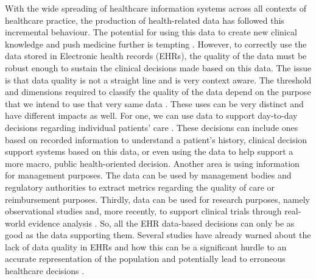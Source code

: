 With the wide spreading of healthcare information systems across all contexts of healthcare practice, the production of health-related data has followed this incremental behaviour. The potential for using this data to create new clinical knowledge and push medicine further is tempting \cite{martin-sanchezBigDataMedicine2014}.
However, to correctly use the data stored in Electronic health records (EHRs), the quality of the data must be robust enough to sustain the clinical decisions made based on this data. The issue is that data quality is not a straight line and is very context aware. The threshold and dimensions required to classify the quality of the data depend on the purpose that we intend to use that very same data \cite{waljiElectronicHealthRecords2019}. These uses can be very distinct and have different impacts as well. For one, we can use data to support day-to-day decisions regarding individual patients' care \cite{verheijPossibleSourcesBias2018}. These decisions can include ones based on recorded information to understand a patient's history, clinical decision support systems based on this data, or even using the data to help support a more macro, public health-oriented decision. Another area is using information for management purposes. The data can be used by management bodies and regulatory authorities to extract metrics regarding the quality of care or reimbursement purposes. Thirdly, data can be used for research purposes, namely observational studies and, more recently, to support clinical trials through real-world evidence analysis \cite{coreyAssessingQualitySurgical2020,verheijPossibleSourcesBias2018,wengClinicalDataQuality2020}. 
So, all the EHR data-based decisions can only be as good as the data supporting them. Several studies have already warned about the lack of data quality in EHRs and how this can be a significant hurdle to an accurate representation of the population and potentially lead to erroneous healthcare decisions \cite{reimerDataQualityAssessment2016a,joukesImpactElectronicPaperBased2019a,huserMultisiteEvaluationData2016,zhangUnderstandingDetectingDefects2020,kramerImpactDataQuality2021,gigantiImpactDataQuality2019}.

